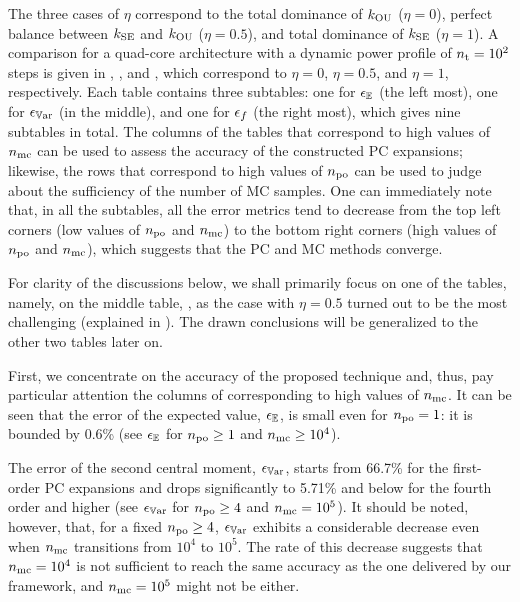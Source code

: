The three cases of $\eta$ correspond to the total dominance of $\fCorr_\OU$ ($\eta = 0$), perfect balance between $\fCorr_\SE$ and $\fCorr_\OU$ ($\eta = 0.5$), and total dominance of $\fCorr_\SE$ ($\eta = 1$).
A comparison for a quad-core architecture with a dynamic power profile of ${n_\text{t}} = 10^2$ steps is given in , , and , which correspond to $\eta = 0$, $\eta = 0.5$, and $\eta = 1$, respectively.
Each table contains three subtables: one for $\epsilon_\mathbb{E}$ (the left most), one for $\epsilon_{\mathbb{V}\text{ar}}$ (in the middle), and one for $\epsilon_f$ (the right most), which gives nine subtables in total.
The columns of the tables that correspond to high values of ${n_\text{mc}}$ can be used to assess the accuracy of the constructed PC expansions; likewise, the rows that correspond to high values of ${n_\text{po}}$ can be used to judge about the sufficiency of the number of MC samples.
One can immediately note that, in all the subtables, all the error metrics tend to decrease from the top left corners (low values of ${n_\text{po}}$ and ${n_\text{mc}}$) to the bottom right corners (high values of ${n_\text{po}}$ and ${n_\text{mc}}$), which suggests that the PC and MC methods converge.

For clarity of the discussions below, we shall primarily focus on one of the tables, namely, on the middle table, , as the case with $\eta = 0.5$ turned out to be the most challenging (explained in ).
The drawn conclusions will be generalized to the other two tables later on.



First, we concentrate on the accuracy of the proposed technique and, thus, pay particular attention the columns of  corresponding to high values of ${n_\text{mc}}$.
It can be seen that the error of the expected value, $\epsilon_\mathbb{E}$, is small even for ${n_\text{po}} = 1$: it is bounded by 0.6\% (see $\epsilon_\mathbb{E}$ for ${n_\text{po}} \geq 1$ and ${n_\text{mc}} \geq 10^4$).

The error of the second central moment, $\epsilon_{\mathbb{V}\text{ar}}$, starts from 66.7\% for the first-order PC expansions and drops significantly to 5.71\% and below for the fourth order and higher (see $\epsilon_{\mathbb{V}\text{ar}}$ for ${n_\text{po}} \geq 4$ and ${n_\text{mc}} = 10^5$).
It should be noted, however, that, for a fixed ${n_\text{po}} \geq 4$, $\epsilon_{\mathbb{V}\text{ar}}$ exhibits a considerable decrease even when ${n_\text{mc}}$ transitions from $10^4$ to $10^5$.
The rate of this decrease suggests that ${n_\text{mc}} = 10^4$ is not sufficient to reach the same accuracy as the one delivered by our framework, and ${n_\text{mc}} = 10^5$ might not be either.

